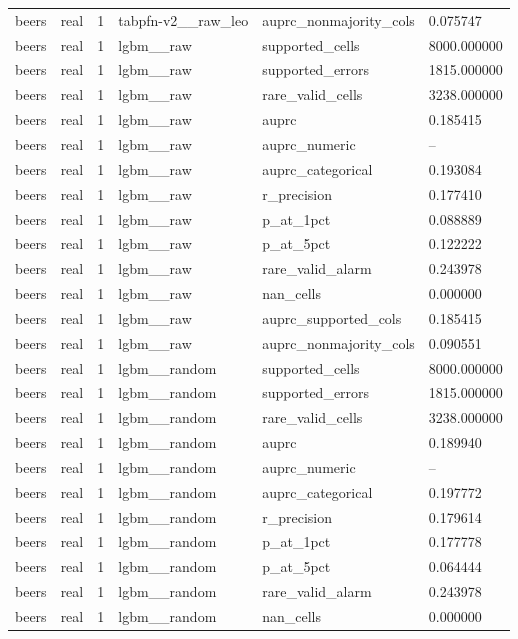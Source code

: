 \begin{tabular}{llllll}
beers & real & 1 & tabpfn-v2\_\_raw\_leo & auprc\_nonmajority\_cols & 0.075747 \\
beers & real & 1 & lgbm\_\_raw & supported\_cells & 8000.000000 \\
beers & real & 1 & lgbm\_\_raw & supported\_errors & 1815.000000 \\
beers & real & 1 & lgbm\_\_raw & rare\_valid\_cells & 3238.000000 \\
beers & real & 1 & lgbm\_\_raw & auprc & 0.185415 \\
beers & real & 1 & lgbm\_\_raw & auprc\_numeric & -- \\
beers & real & 1 & lgbm\_\_raw & auprc\_categorical & 0.193084 \\
beers & real & 1 & lgbm\_\_raw & r\_precision & 0.177410 \\
beers & real & 1 & lgbm\_\_raw & p\_at\_1pct & 0.088889 \\
beers & real & 1 & lgbm\_\_raw & p\_at\_5pct & 0.122222 \\
beers & real & 1 & lgbm\_\_raw & rare\_valid\_alarm & 0.243978 \\
beers & real & 1 & lgbm\_\_raw & nan\_cells & 0.000000 \\
beers & real & 1 & lgbm\_\_raw & auprc\_supported\_cols & 0.185415 \\
beers & real & 1 & lgbm\_\_raw & auprc\_nonmajority\_cols & 0.090551 \\
beers & real & 1 & lgbm\_\_random & supported\_cells & 8000.000000 \\
beers & real & 1 & lgbm\_\_random & supported\_errors & 1815.000000 \\
beers & real & 1 & lgbm\_\_random & rare\_valid\_cells & 3238.000000 \\
beers & real & 1 & lgbm\_\_random & auprc & 0.189940 \\
beers & real & 1 & lgbm\_\_random & auprc\_numeric & -- \\
beers & real & 1 & lgbm\_\_random & auprc\_categorical & 0.197772 \\
beers & real & 1 & lgbm\_\_random & r\_precision & 0.179614 \\
beers & real & 1 & lgbm\_\_random & p\_at\_1pct & 0.177778 \\
beers & real & 1 & lgbm\_\_random & p\_at\_5pct & 0.064444 \\
beers & real & 1 & lgbm\_\_random & rare\_valid\_alarm & 0.243978 \\
beers & real & 1 & lgbm\_\_random & nan\_cells & 0.000000 \\

\end{tabular}
